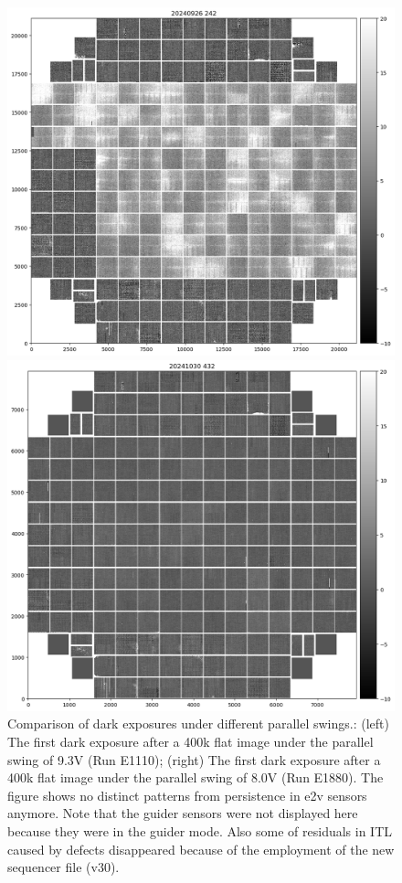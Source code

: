\begin{figure}[h]
\centering
\begin{minipage}[b]{0.45\textwidth}
\centering
\includegraphics[width=\textwidth]{sections/figures/E1110dp93.png}
\end{minipage}
\hfill
\begin{minipage}[b]{0.45\textwidth}
\centering
\includegraphics[width=\textwidth]{sections/figures/E1880dp80.png}
\end{minipage}
\caption{Comparison of dark exposures under different parallel swings.: (left) The first dark exposure after a 400k flat image under the parallel swing of 9.3V (Run E1110); (right) The first dark exposure after a 400k flat image under the parallel swing of 8.0V (Run E1880). The figure shows no distinct patterns from persistence in e2v sensors anymore. Note that the guider sensors were not displayed here because they were in the guider mode. Also some of residuals in ITL caused by defects disappeared because of the employment of the new sequencer file (v30).}
\end{figure}
